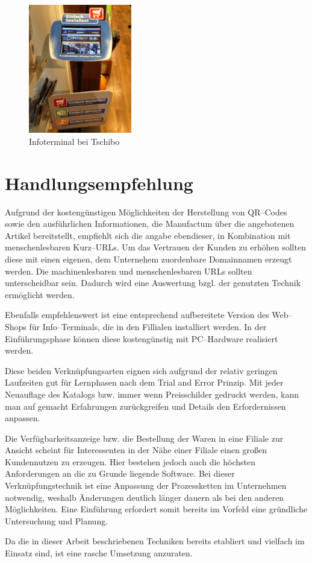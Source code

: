 \begin{figure}[H]
\begin{center}
\includegraphics[width=0.4\textwidth]{Tschibo-Infoterminal.jpg}
\caption{Infoterminal bei Tschibo}
\label{pic:tschiboit}
\end{center}
\end{figure}

\section{Handlungsempfehlung}
\label{hempf}

Aufgrund der kostengünstigen Möglichkeiten der Herstellung von QR--Codes sowie den ausführlichen Informationen, die Manufactum über die angebotenen Artikel bereitstellt, empfiehlt sich die angabe ebendieser, in Kombination mit menschenlesbaren Kurz--URLs. Um das Vertrauen der Kunden zu erhöhen sollten diese mit einen eigenen, dem Unternehem zuordenbare Domainnamen erzeugt werden. Die machinenlesbaren und menschenlesbaren URLs sollten unterscheidbar sein. Dadurch wird eine Auswertung bzgl. der genutzten Technik ermöglicht werden.

Ebenfalls empfehlenswert ist eine entsprechend aufbereitete Version des Web--Shops für Info--Terminals, die in den Fillialen installiert werden. In der Einführungsphase können diese kostengünstig mit PC--Hardware realisiert werden.

Diese beiden Verknüpfungsarten eignen sich aufgrund der relativ geringen Laufzeiten gut für Lernphasen nach dem Trial and Error Prinzip. Mit jeder Neuauflage des Katalogs bzw. immer wenn Preisschilder gedruckt werden, kann man auf gemacht Erfahrungen zurückgreifen und Details den Erfordernissen anpassen.

Die Verfügbarkeitsanzeige bzw. die Bestellung der Waren in eine Filiale zur Ansicht scheint für Interessenten in der Nähe einer Filiale einen großen Kundennutzen zu erzeugen. Hier bestehen jedoch auch die höchsten Anforderungen an die zu Grunde liegende Software. Bei dieser Verknüpfungstechnik ist eine Anpassung der Prozessketten im Unternehmen notwendig, weshalb Änderungen deutlich länger dauern als bei den anderen Möglichkeiten. Eine Einführung erfordert somit bereits im Vorfeld eine gründliche Untersuchung und Planung. 

Da die in dieser Arbeit beschriebenen Techniken bereits etabliert und vielfach im Einsatz sind, ist eine rasche Umsetzung anzuraten.










